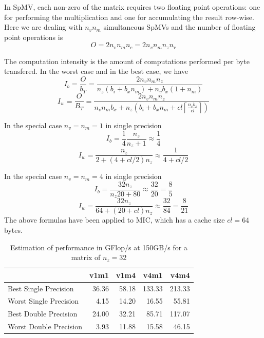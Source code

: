 \documentclass[10pt,conference,compsocconf]{IEEEtran}
\newcommand{\ceil}[1]{\left\lceil#1\right\rceil}
\begin{document}
In SpMV, each non-zero of the matrix requires two floating point
operations: one for performing the multiplication and one for
accumulating the result row-wise. Here we are dealing with $n_v n_m$
simultaneous SpMVs and the number of floating point operations is
$$O = 2 n_v n_m n_c = 2 n_v n_m n_z n_r$$

The computation intensity is the amount of computations performed per
byte transfered. In the worst case and in the best case, we have
$$I_b = \frac{O}{b_T} = \frac{2 n_v n_m n_z}{n_z (b_i + b_x n_m) + n_v b_x (1 + n_m)}$$
$$I_w = \frac{O}{B_T} = \frac{2 n_v n_m n_z}{n_v n_m b_x + n_z \left ( b_i + b_x n_m +  cl \ceil{\frac{n_vb_x}{cl}} \right)}$$

In the special case $n_v=n_m=1$ in single precision
$$I_b = \frac{1}{4} \frac{ n_z }{ n_z + 1} \approx \frac{1}{4}$$
$$I_w = \frac{n_z }{2  + (4+cl/2)  n_z} \approx \frac{1}{4+cl/2}$$

In the special case $n_v=n_m=4$ in single precision
$$I_b = \frac{32 n_z }{ n_z 20 + 80} \approx \frac{32}{20} = \frac{8}{5} $$
$$I_w = \frac{32 n_z }{64 + (20+cl) n_z} \approx \frac{32}{84} = \frac{8}{21} $$
The above formulas have been applied to MIC, which has a cache size $cl=64$ bytes.

\begin{table}
  \centering
  \begin{tabular}{|l|r|r|r|r|}
    \hline
                           & v1m1  & v1m4  & v4m1   & v4m4  \\
    \hline
    Best Single Precision  & 36.36 & 58.18 & 133.33 & 213.33\\
    Worst Single Precision &  4.15 & 14.20 &  16.55 &  55.81\\
    Best Double Precision  & 24.00 & 32.21 &  85.71 & 117.07\\
    Worst Double Precision &  3.93 & 11.88 &  15.58 &  46.15\\
    \hline
  \end{tabular}
  \caption{Estimation of performance in GFlop/s at 150GB/s for a
    matrix of $n_z = 32$}
\end{table}
\end{document}
